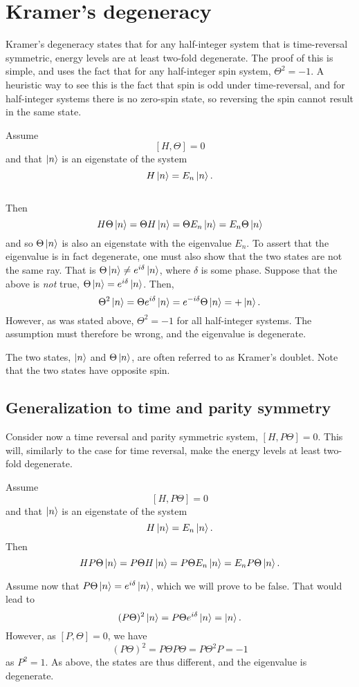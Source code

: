 \section{Kramer's degeneracy}


Kramer's degeneracy states that for any half-integer system that is time-reversal symmetric, energy levels are at least two-fold degenerate.
The proof of this is simple, and uses the fact that for any half-integer spin system, $\Theta^2 = -1$.
A heuristic way to see this is the fact that spin is odd under time-reversal, and for half-integer systems there is no zero-spin state, so reversing the spin cannot result in the same state.
\begin{Proof}
  Assume
  $$ [H, \Theta] = 0 $$
  and that $\ket{n}$ is an eigenstate of the system
  $$ H \ket{n} = E_n \ket{n}.$$\\
  Then
  $$
  H \Theta \ket{n} = \Theta H \ket{n} = \Theta E_n \ket{n} = E_n \Theta \ket{n}
  $$
  and so $\Theta \ket{n}$ is also an eigenstate with the eigenvalue $E_n$.
  To assert that the eigenvalue is in fact degenerate, one must also show that the two states are not the same ray.
  That is $\Theta \ket{n} \neq e^{i \delta} \ket{n}$, where $\delta$ is some phase.
  Suppose that the above is \emph{not} true, $\Theta \ket{n} = e^{i \delta} \ket{n}$.
  Then,
  $$
  \Theta^2 \ket{n} = \Theta e^{i\delta} \ket{n} = e^{-i\delta} \Theta \ket{n} = + \ket{n}.
  $$
  However, as was stated above, $\Theta^2 = -1$ for all half-integer systems.
  The assumption must therefore be wrong, and the eigenvalue is degenerate.
\end{Proof}
The two states, $\ket{n}$ and $\Theta \ket{n}$, are often referred to as Kramer's doublet.
Note that the two states have opposite spin.

\subsection{Generalization to time and parity symmetry}
Consider now a time reversal and parity symmetric system, $[H, P \Theta] = 0$.
This will, similarly to the case for time reversal, make the energy levels at least two-fold degenerate.
\begin{Proof}
  Assume
  $$
  [H,P \Theta] = 0
  $$
  and that $\ket{n}$ is an eigenstate of the system
  $$
  H\ket{n} = E_n\ket{n}.
  $$
  Then
  $$
  H P \Theta\ket{n} =
  P\Theta H \ket{n} =
  P \Theta E_n \ket{n} =
  E_n P\Theta \ket{n}.
  $$

  Assume now that $P\Theta \ket{n} = e^{i\delta} \ket{n}$, which we will prove to be false.
  That would lead to
  $$
  (P\Theta)^2 \ket{n} = P\Theta e^{i\delta} \ket{n}
  = \ket{n}.
  $$
  However, as $[P, \Theta] = 0$, we have
  $$
  (P\Theta)^2 =
  P\Theta P \Theta=
  P\Theta^2 P=
  -1
  $$
  as $P^2 = 1$.
  As above, the states are thus different, and the eigenvalue is degenerate.
\end{Proof}
